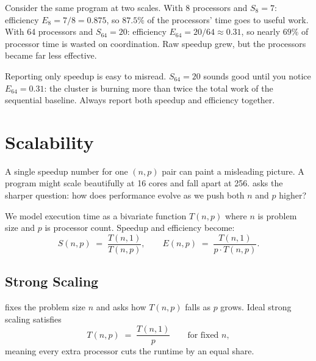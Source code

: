 \begin{ppexample}
Consider the same program at two scales.
With 8 processors and $S_8 = 7$: efficiency $E_8 = 7/8 = 0.875$, so
$87.5\%$ of the processors' time goes to useful work.
With 64 processors and $S_{64} = 20$: efficiency
$E_{64} = 20/64 \approx 0.31$, so nearly $69\%$ of processor time is
wasted on coordination.
Raw speedup grew, but the processors became far less effective.
\end{ppexample}

\begin{pppitfall}
Reporting only speedup is easy to misread.
$S_{64} = 20$ sounds good until you notice $E_{64} = 0.31$: the cluster
is burning more than twice the total work of the sequential baseline.
Always report both speedup and efficiency together.
\end{pppitfall}

\section{Scalability}
\label{sec:scalability}

A single speedup number for one $(n, p)$ pair can paint a misleading
picture.
A program might scale beautifully at 16 cores and fall apart at 256.
 asks the sharper question: how does performance
evolve as we push both $n$ and $p$ higher?

We model execution time as a bivariate function $T(n, p)$ where $n$ is
problem size and $p$ is processor count.
Speedup and efficiency become:
\[
  S(n, p) \;=\; \frac{T(n,1)}{T(n,p)}, \qquad
  E(n, p) \;=\; \frac{T(n,1)}{p \cdot T(n,p)}.
\]

\subsection{Strong Scaling}

\begin{ppdefn}
 fixes the problem size $n$ and asks how $T(n,p)$
falls as $p$ grows.
Ideal strong scaling satisfies
\[
  T(n, p) \;=\; \frac{T(n,1)}{p} \qquad \text{for fixed } n,
\]
meaning every extra processor cuts the runtime by an equal share.
\end{ppdefn}

